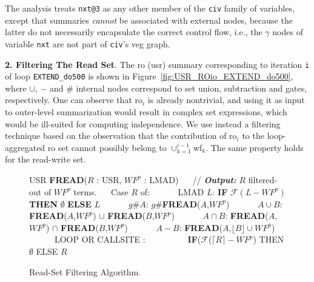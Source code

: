 \documentclass[10pt,nocopyrightspace]{sigplanconf}
\begin{document}
The analysis treats {\tt nxt@3} as any other member of the {\tt civ} family of 
variables, except that summaries {\em cannot} be associated with external nodes,
because the latter do not necessarily encapsulate the correct control flow,
i.e., the $\gamma$ nodes of variable {\tt nxt} are not part of {\tt civ}'s {\sc veg} graph.

\vspace{1ex}

{\bf 2. Filtering The Read Set}. The {\sc ro} ({\sc usr}) summary corresponding 
to iteration {\tt i} of loop {\tt EXTEND\_do500} is shown in 
Figure~\ref{fig:USR_ROio_EXTEND_do500}, where $\cup$, $-$ and $\#$ internal nodes 
correspond to set union, subtraction and gates, respectively.   
One can observe that {\sc ro}$_{i}$ is already nontrivial, and using it as
input to outer-level summarization would result in complex set expressions,
which would be ill-suited for computing independence.
%
We use instead a filtering technique based on the observation that
the contribution of {\sc ro}$_i$ to the loop-aggregated
{\sc ro} set cannot possibly belong to $\cup_{k=1}^{i-1}${\sc wf}$_k$.
The same property holds for the read-write set.

\begin{figure}[t]
\begin{scriptsize}
USR {\bf FREAD}($R$ : USR, $WF^p$ : LMAD) \vspace{1ex} \newline
$\mbox{ }\mbox{ }$// {\bf {\em Output:}} $R$ filtered-out of $WF^p$ terms. \vspace{1ex} \newline
$\mbox{ }\mbox{ }$Case $R$ of: \vspace{1ex} \newline
$\mbox{ }\mbox{ }\mbox{ }\mbox{ }$ LMAD $L$:  
{\bf IF} $\mathcal{F}(L - WF^p)$ {\bf THEN} $\emptyset$ {\bf ELSE} $L$ \vspace{1ex} \newline
$\mbox{ }\mbox{ }\mbox{ }\mbox{ }$ $g\#A$: $g\#${\bf FREAD}($A$,$WF^p$)  \vspace{1ex} \newline   
$\mbox{ }\mbox{ }\mbox{ }\mbox{ }$ $A \cup B$: {\bf FREAD}($A$,$WF^p$) $\cup$ {\bf FREAD}($B$,$WF^p$) \vspace{1ex} \newline
$\mbox{ }\mbox{ }\mbox{ }\mbox{ }$ $A \cap B$: {\bf FREAD}($A$,$WF^p$) $\cap$ {\bf FREAD}($B$,$WF^p$) \vspace{1ex} \newline
$\mbox{ }\mbox{ }\mbox{ }\mbox{ }$ $A - B$: {\bf FREAD}($A$,$\lfloor B \rfloor \cup WF^p$)   \vspace{1ex} \newline
$\mbox{ }\mbox{ }\mbox{ }\mbox{ }$ LOOP OR CALLSITE :   \vspace{1ex} \newline   
$\mbox{ }\mbox{ }\mbox{ }$ 
$\mbox{ }\mbox{ }\mbox{ }$ 
          {\bf IF}($\mathcal{F}$($\lceil R \rceil - WF^p$) THEN $\emptyset$ ELSE $R$
\end{scriptsize}
\caption{ Read-Set Filtering Algorithm.}
\label{fig:ReadFilt} %
\end{figure}
 
\end{document}
